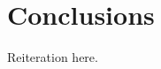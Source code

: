 \documentclass[modern,trackchanges]{aastex631}
\begin{document}







\section{Conclusions}
\label{sec:conclusions}

Reiteration here.

\clearpage
\pagebreak


\end{document}
